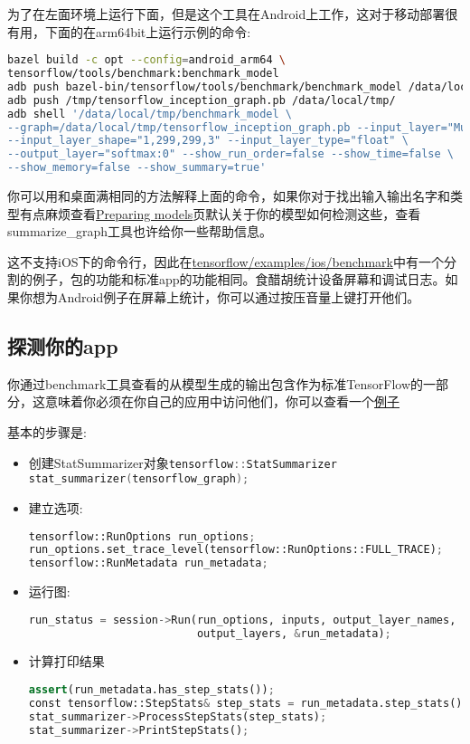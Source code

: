 为了在左面环境上运行下面，但是这个工具在Android上工作，这对于移动部署很有用，下面的在arm64bit上运行示例的命令:
\begin{lstlisting}[language=Bash]
bazel build -c opt --config=android_arm64 \ 
tensorflow/tools/benchmark:benchmark_model
adb push bazel-bin/tensorflow/tools/benchmark/benchmark_model /data/local/tmp
adb push /tmp/tensorflow_inception_graph.pb /data/local/tmp/
adb shell '/data/local/tmp/benchmark_model \
--graph=/data/local/tmp/tensorflow_inception_graph.pb --input_layer="Mul" \
--input_layer_shape="1,299,299,3" --input_layer_type="float" \
--output_layer="softmax:0" --show_run_order=false --show_time=false \
--show_memory=false --show_summary=true'
\end{lstlisting}
你可以用和桌面满相同的方法解释上面的命令，如果你对于找出输入输出名字和类型有点麻烦查看\href{https://www.tensorflow.org/mobile/prepare_models?hl=zh-cn}{Preparing models}页默认关于你的模型如何检测这些，查看summarize\_graph工具也许给你一些帮助信息。

这不支持iOS下的命令行，因此在\href{https://www.github.com/tensorflow/tensorflow/blob/r1.4/tensorflow/examples/ios/benchmark}{tensorflow/examples/ios/benchmark}中有一个分割的例子，包的功能和标准app的功能相同。食醋胡统计设备屏幕和调试日志。如果你想为Android例子在屏幕上统计，你可以通过按压音量上键打开他们。

\subsection{探测你的app}
你通过benchmark工具查看的从模型生成的输出包含作为标准TensorFlow的一部分，这意味着你必须在你自己的应用中访问他们，你可以查看一个\href{https://www.github.com/tensorflow/tensorflow/blob/r1.4/tensorflow/examples/ios/benchmark/BenchmarkViewController.mm?l=139}{例子}

基本的步骤是:
\begin{itemize}
\item 创建StatSummarizer对象\lstinline[language=C++]{tensorflow::StatSummarizer stat_summarizer(tensorflow_graph);}
\item 建立选项:
\begin{lstlisting}[language=Python]
tensorflow::RunOptions run_options;
run_options.set_trace_level(tensorflow::RunOptions::FULL_TRACE);
tensorflow::RunMetadata run_metadata;
\end{lstlisting}
\item 运行图:
\begin{lstlisting}[language=Python]
run_status = session->Run(run_options, inputs, output_layer_names, {},
                          output_layers, &run_metadata);

\end{lstlisting}
\item 计算打印结果\begin{lstlisting}[language=Python]
assert(run_metadata.has_step_stats());
const tensorflow::StepStats& step_stats = run_metadata.step_stats();
stat_summarizer->ProcessStepStats(step_stats);
stat_summarizer->PrintStepStats();
\end{lstlisting}
\end{itemize}
